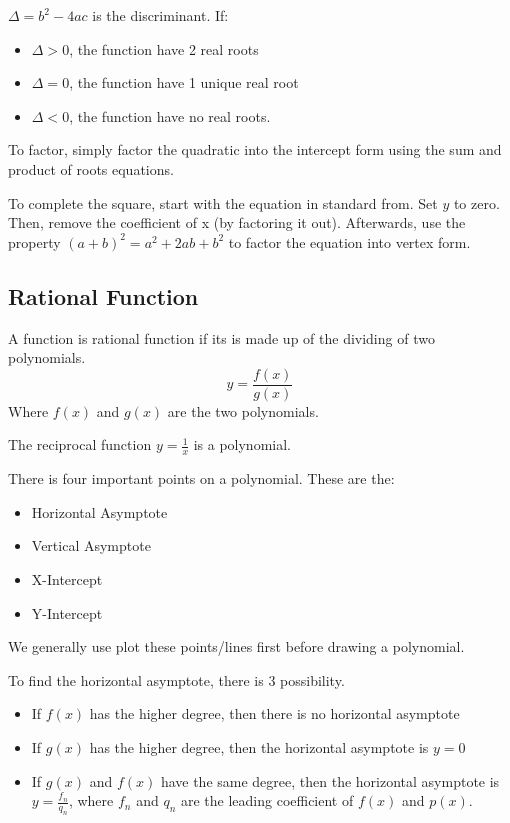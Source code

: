 \documentclass[../notes.tex]{subfiles}
\begin{document}
$\Delta = b^2-4ac$ is the discriminant.
If:
\begin{itemize}
	\item $\Delta > 0$, the function have 2 real roots
	\item $\Delta = 0$, the function have 1 unique real root
	\item $\Delta < 0$, the function have no real roots. 
\end{itemize}

To factor, simply factor the quadratic into the intercept form using the sum and product of roots equations.

To complete the square, start with the equation in standard from.
Set $y$ to zero.
Then, remove the coefficient of x (by factoring it out).
Afterwards, use the property $(a+b)^2  = a^2 + 2ab + b^2$ to factor the equation into vertex form.

\subsection{Rational Function}
A function is rational function if its is made up of the dividing of two polynomials.
\begin{equation}
	y = \frac{f(x)}{g(x)}
\end{equation}
Where $f(x)$ and $g(x)$ are the two polynomials.

The reciprocal function $y=\frac{1}{x}$ is a polynomial.

There is four important points on a polynomial. 
These are the:
\begin{itemize}
	\item Horizontal Asymptote
	\item Vertical Asymptote
	\item X-Intercept
	\item Y-Intercept
\end{itemize} 
We generally use plot these points/lines first before drawing a polynomial.

To find the horizontal asymptote, there is 3 possibility.
\begin{itemize}
	\item If $f(x)$ has the higher degree, then there is no horizontal asymptote
	\item If $g(x)$ has the higher degree, then the horizontal asymptote is $y=0$ 
	\item If $g(x)$ and $f(x)$ have the same degree, then the horizontal asymptote is $y=\frac{f_n}{q_n}$, where $f_n$ and $q_n$ are the leading coefficient of  $f(x)$ and  $p(x)$. 
\end{itemize}
\end{document}
